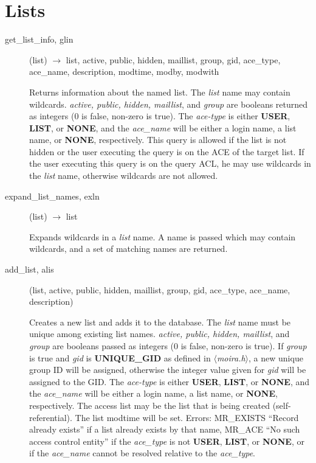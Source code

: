 \documentclass{article}
\begin{document}
\section{Lists}

\begin{description}

\item[get\_list\_info, glin](list) $\rightarrow$ list, active, public, hidden,
maillist, group, gid, ace\_type, ace\_name, description, modtime, modby,
modwith

Returns information about the named list.  The {\em list} name may
contain wildcards.  {\em active, public, hidden, maillist}, and
{\em group} are booleans returned as integers (0 is false, non-zero is
true).  The {\em ace-type} is either {\bf USER}, {\bf LIST}, or {\bf NONE},
and the {\em ace\_name} will be either a login name, a list name, or
{\bf NONE}, respectively.  This query is allowed if the list is not
hidden or the user executing the query is on the ACE of the target
list.  If the user executing this query is on the query ACL, he may
use wildcards in the {\em list} name, otherwise wildcards are not
allowed.

\item[expand\_list\_names, exln](list) $\rightarrow$ list

Expands wildcards in a {\em list} name.  A name is passed which may
contain wildcards, and a set of matching names are returned.

\item[add\_list, alis](list, active, public, hidden, maillist, group, gid,
ace\_type, ace\_name, description)

Creates a new list and adds it to the database. The {\em list} name
must be unique among existing list names. {\em active, public, hidden,
maillist}, and {\em group} are booleans passed as integers (0 is
false, non-zero is true). If {\em group} is true and {\em gid} is {\bf
UNIQUE\_GID} as defined in {\em $\langle$moira.h$\rangle$}, a new
unique group ID will be assigned, otherwise the integer value given
for {\em gid} will be assigned to the GID. The {\em ace-type} is
either {\bf USER}, {\bf LIST}, or {\bf NONE}, and the {\em ace\_name}
will be either a login name, a list name, or {\bf NONE}, respectively.
The access list may be the list that is being created
(self-referential). The list modtime will be set. Errors: MR\_EXISTS
``Record already exists'' if a list already exists by that name, MR\_ACE
``No such access control entity'' if the {\em ace\_type} is not {\bf
USER}, {\bf LIST}, or {\bf NONE}, or if the {\em ace\_name} cannot be
resolved relative to the {\em ace\_type}.


\end{description}
\end{document}
